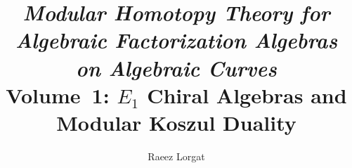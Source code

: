 \documentclass[11pt]{memoir}
\title{\texorpdfstring{\textit{Modular Homotopy Theory for Algebraic Factorization Algebras on Algebraic Curves}\\[0.5em]\large Volume~1: $E_1$ Chiral Algebras and Modular Koszul Duality}{Modular Homotopy Theory for Algebraic Factorization Algebras on Algebraic Curves. Volume 1: E1 Chiral Algebras and Modular Koszul Duality}}
\author{Raeez Lorgat}
\date{}
\providecommand{\op}{\mathrm{op}}
\begin{document}
\hypersetup{pageanchor=false}

\providecommand{\Aut}{\operatorname{Aut}}
\providecommand{\mathbbm}[1]{\mathbb{#1}}
\providecommand{\bigboxtimes}{\mathop{\boxtimes}\displaylimits}
\providecommand{\Bbar}{\bar{B}}
\providecommand{\B}{\bar{B}}
\providecommand{\Det}{\mathrm{Det}}
\providecommand{\Cobar}{\Omega}
\providecommand{\Barch}{\overline{B}^{\mathrm{ch}}}
\providecommand{\coHoch}{\operatorname{coHH}}
\providecommand{\KK}{\mathbb{K}}
\providecommand{\gr}{\operatorname{gr}}
\providecommand{\DR}{\mathrm{DR}}
\providecommand{\im}{\operatorname{im}}
\providecommand{\ad}{\operatorname{ad}}
\providecommand{\id}{\mathrm{id}}
\providecommand{\dlog}{d\log}
\providecommand{\otim}{\otimes}
\providecommand{\normord}[1]{:{#1}:}
\providecommand{\Bl}{\operatorname{Bl}}
\providecommand{\shuffle}{\mathbin{\amalg}}
\providecommand{\STATE}{\State}
\providecommand{\FOR}{\For}
\providecommand{\ENDFOR}{\EndFor}
\providecommand{\bA}{\mathbb{A}}
\providecommand{\bC}{\mathbb{C}}
\providecommand{\bF}{\mathbb{F}}
\providecommand{\bP}{\mathbb{P}}
\providecommand{\bZ}{\mathbb{Z}}
\providecommand{\bR}{\mathbb{R}}
\providecommand{\bQ}{\mathbb{Q}}
\providecommand{\bG}{\mathbb{G}}
\providecommand{\cC}{\mathcal{C}}
\providecommand{\cD}{\mathcal{D}}
\providecommand{\cE}{\mathcal{E}}
\providecommand{\cF}{\mathcal{F}}
\providecommand{\cH}{\mathcal{H}}
\providecommand{\cL}{\mathcal{L}}
\providecommand{\cM}{\mathcal{M}}
\providecommand{\cN}{\mathcal{N}}
\providecommand{\cO}{\mathcal{O}}
\providecommand{\cP}{\mathcal{P}}
\providecommand{\cY}{\mathcal{Y}}
\providecommand{\cZ}{\mathcal{Z}}
\providecommand{\fS}{\mathfrak{S}}
\providecommand{\fg}{\mathfrak{g}}
\providecommand{\fh}{\mathfrak{h}}
\providecommand{\SCchtop}{\mathsf{SC}^{\mathrm{ch,top}}}
\providecommand{\fsl}{\mathfrak{sl}}
\providecommand{\fn}{\mathfrak{n}}
\providecommand{\fC}{\mathfrak{C}}
\providecommand{\wt}{\operatorname{wt}}
\providecommand{\DS}{\mathrm{DS}}
\providecommand{\pr}{\mathrm{pr}}
\providecommand{\bD}{\mathbf{D}}
\providecommand{\Cone}{\operatorname{Cone}}
\providecommand{\Span}{\operatorname{Span}}
\providecommand{\HH}{\operatorname{HH}}
\providecommand{\op}{\mathrm{op}}
\providecommand{\cop}{\mathrm{cop}}
\providecommand{\rev}{\mathrm{rev}}
\providecommand{\alg}{\mathrm{alg}}
\providecommand{\red}{\mathrm{red}}
\providecommand{\Hch}{H^{\mathrm{ch}}}
\end{document}
